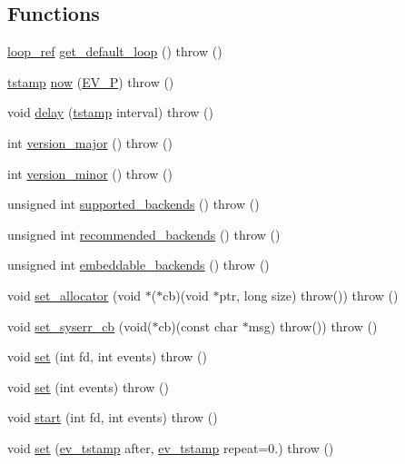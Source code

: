 \subsection*{\-Functions}
\begin{DoxyCompactItemize}
\item 
\hyperlink{structev_1_1loop__ref}{loop\-\_\-ref} \hyperlink{namespaceev_ac0c096b0140f59d5c5abea256f0c75c4}{get\-\_\-default\-\_\-loop} ()  throw ()
\item 
\hyperlink{namespaceev_a9853823b701944a8a5ce179d10a24b97}{tstamp} \hyperlink{namespaceev_a260a36d42568d9d1820af7537fc1bae2}{now} (\hyperlink{ev_8h_a6e6c6b499d18513c01cf4bde00121617}{\-E\-V\-\_\-\-P})  throw ()
\item 
void \hyperlink{namespaceev_aea693915baceb9cb7517a52c578a4a94}{delay} (\hyperlink{namespaceev_a9853823b701944a8a5ce179d10a24b97}{tstamp} interval)  throw ()
\item 
int \hyperlink{namespaceev_a0d3917d61c37bb24db1d864e2ac4552f}{version\-\_\-major} ()  throw ()
\item 
int \hyperlink{namespaceev_abfc4ac781668b20171841d8dda0317a0}{version\-\_\-minor} ()  throw ()
\item 
unsigned int \hyperlink{namespaceev_ae3ffb75868e8c2922a0f4a2f67593093}{supported\-\_\-backends} ()  throw ()
\item 
unsigned int \hyperlink{namespaceev_a8cb5adc662fb62112386efd00b0af595}{recommended\-\_\-backends} ()  throw ()
\item 
unsigned int \hyperlink{namespaceev_a0a9dd6a12517dc1d8ece8100eab7b28c}{embeddable\-\_\-backends} ()  throw ()
\item 
void \hyperlink{namespaceev_a7ff6e0fbf0cd740f0065b73588dbe7b4}{set\-\_\-allocator} (void $\ast$($\ast$cb)(void $\ast$ptr, long size) throw())  throw ()
\item 
void \hyperlink{namespaceev_abca03339e2d94adc78a0bcf0acf6ccae}{set\-\_\-syserr\-\_\-cb} (void($\ast$cb)(const char $\ast$msg) throw())  throw ()
\item 
void \hyperlink{namespaceev_a6b46afd8229a5e1c940c265127857088}{set} (int fd, int events)  throw ()
\item 
void \hyperlink{namespaceev_a08ae4b9113645a19793a0b12eea43939}{set} (int events)  throw ()
\item 
void \hyperlink{namespaceev_a1dd5727612e83d2114a052325db53cff}{start} (int fd, int events)  throw ()
\item 
void \hyperlink{namespaceev_a62e8d4db09755b6ac44bc00f8a79f947}{set} (\hyperlink{ev_8h_add71e34ce2b04bbf7eb6f31a850814e8}{ev\-\_\-tstamp} after, \hyperlink{ev_8h_add71e34ce2b04bbf7eb6f31a850814e8}{ev\-\_\-tstamp} repeat=0.)  throw ()

\end{DoxyCompactItemize}
